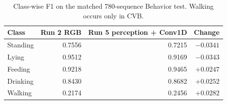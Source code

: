 \begin{table}[htbp]
\centering\small
\caption[Matched Behavior class-wise comparison]{Class-wise F1 on the matched 780-sequence Behavior test. Walking occurs only in CVB.}
\label{tab:behaviorclasscomparison}
\begin{tabular}{lrrr}
\toprule
Class & Run 2 RGB & Run 5 perception + Conv1D & Change \\
\midrule
Standing & 0.7556 & 0.7215 & $-0.0341$ \\
Lying & 0.9512 & 0.9169 & $-0.0343$ \\
Feeding & 0.9218 & 0.9465 & $+0.0247$ \\
Drinking & 0.8430 & 0.8682 & $+0.0252$ \\
Walking & 0.2174 & 0.2456 & $+0.0282$ \\
\bottomrule
\end{tabular}
\end{table}
